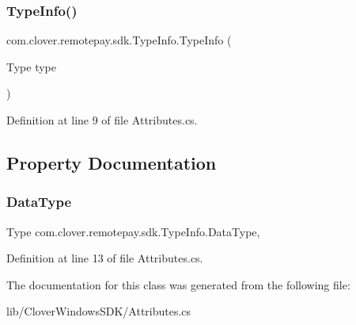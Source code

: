 \subsubsection{\texorpdfstring{Type\+Info()}{TypeInfo()}}
{\footnotesize\ttfamily com.\+clover.\+remotepay.\+sdk.\+Type\+Info.\+Type\+Info (\begin{DoxyParamCaption}\item[{Type}]{type }\end{DoxyParamCaption})}



Definition at line 9 of file Attributes.\+cs.



\subsection{Property Documentation}
\mbox{\label{classcom_1_1clover_1_1remotepay_1_1sdk_1_1_type_info_a132ce2ff6112da78d014a434cc7d5097}} 
\subsubsection{\texorpdfstring{Data\+Type}{DataType}}
{\footnotesize\ttfamily Type com.\+clover.\+remotepay.\+sdk.\+Type\+Info.\+Data\+Type\hspace{0.3cm}{\ttfamily [get]}, {\ttfamily [set]}}



Definition at line 13 of file Attributes.\+cs.



The documentation for this class was generated from the following file\+:\begin{DoxyCompactItemize}
\item 
lib/\+Clover\+Windows\+S\+D\+K/Attributes.\+cs\end{DoxyCompactItemize}
